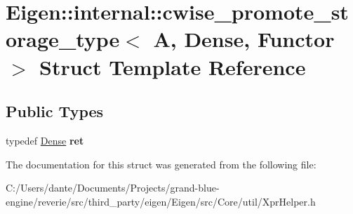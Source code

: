 \hypertarget{struct_eigen_1_1internal_1_1cwise__promote__storage__type_3_01_a_00_01_dense_00_01_functor_01_4}{}\section{Eigen\+::internal\+::cwise\+\_\+promote\+\_\+storage\+\_\+type$<$ A, Dense, Functor $>$ Struct Template Reference}
\label{struct_eigen_1_1internal_1_1cwise__promote__storage__type_3_01_a_00_01_dense_00_01_functor_01_4}
\subsection*{Public Types}
\begin{DoxyCompactItemize}
\item 
\mbox{\label{struct_eigen_1_1internal_1_1cwise__promote__storage__type_3_01_a_00_01_dense_00_01_functor_01_4_a429cffc517ae01cf82bd938252cc7e34}} 
typedef \mbox{\hyperlink{struct_eigen_1_1_dense}{Dense}} {\bfseries ret}
\end{DoxyCompactItemize}


The documentation for this struct was generated from the following file\+:\begin{DoxyCompactItemize}
\item 
C\+:/\+Users/dante/\+Documents/\+Projects/grand-\/blue-\/engine/reverie/src/third\+\_\+party/eigen/\+Eigen/src/\+Core/util/Xpr\+Helper.\+h\end{DoxyCompactItemize}
